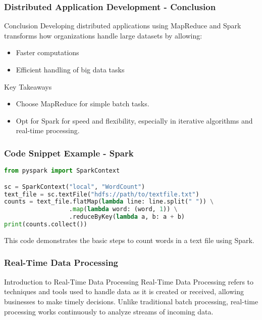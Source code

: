 \documentclass[aspectratio=169]{beamer}
\begin{document}
\begin{frame}[fragile]
    \frametitle{Distributed Application Development - Conclusion}
    \begin{block}{Conclusion}
        Developing distributed applications using MapReduce and Spark transforms how organizations handle large datasets by allowing:
        \begin{itemize}
            \item Faster computations
            \item Efficient handling of big data tasks
        \end{itemize}
    \end{block}
    
    \begin{block}{Key Takeaways}
        \begin{itemize}
            \item Choose MapReduce for simple batch tasks.
            \item Opt for Spark for speed and flexibility, especially in iterative algorithms and real-time processing.
        \end{itemize}
    \end{block}
\end{frame}

\begin{frame}[fragile]
    \frametitle{Code Snippet Example - Spark}
    \begin{lstlisting}[language=Python]
from pyspark import SparkContext

sc = SparkContext("local", "WordCount")
text_file = sc.textFile("hdfs://path/to/textfile.txt")
counts = text_file.flatMap(lambda line: line.split(" ")) \
                  .map(lambda word: (word, 1)) \
                  .reduceByKey(lambda a, b: a + b)
print(counts.collect())
    \end{lstlisting}
    This code demonstrates the basic steps to count words in a text file using Spark.
\end{frame}

\begin{frame}[fragile]
    \frametitle{Real-Time Data Processing}
    \begin{block}{Introduction to Real-Time Data Processing}
        Real-Time Data Processing refers to techniques and tools used to handle data as it is created or received, allowing businesses to make timely decisions. Unlike traditional batch processing, real-time processing works continuously to analyze streams of incoming data.
    \end{block}
\end{frame}
\end{document}
